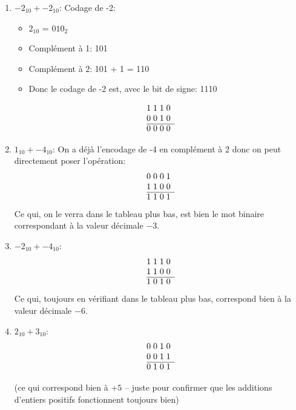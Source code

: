 \documentclass[12pt]{article}
\newenvironment{MaReponse}
		{\begin{greyedtextbox}\itshape} %
		{\end{greyedtextbox}}            %
\newenvironment{alphenum}
{\begin{enumerate}[label=\alph*.]}
	{\end{enumerate}}
\begin{document}
\begin{MaReponse}
\begin{alphenum}
			\item $-2_{10} + -2_{10}$: Codage de -2:
			\begin{itemize}
				\item $2_{10}$ = $010_2$
				\item Complément à 1: 101
				\item Complément à 2: 101 + 1 = 110
				\item Donc le codage de -2 est, avec le bit de signe: 1110
			\end{itemize}
			\[
			\begin{array}{@{}r *{4}{@{\;}c}}
				& 1 & 1 & 1 & 0 \\
				& 0 & 0 & 1 & 0  \\
				\cline{2-5}
				& 0 & 0 & 0 & 0 \\
			\end{array}
			\]
			\item $1_{10} + -4_{10}$: On a déjà l'encodage de -4 en complément à 2 donc on peut directement poser l'opération:
			\[
			\begin{array}{@{}r *{4}{@{\;}c}}
				& 0 & 0 & 0 & 1 \\
				& 1 & 1 & 0 & 0  \\
				\cline{2-5}
				& 1 & 1 & 0 & 1 \\
			\end{array}
			\]
			Ce qui, on le verra dans le tableau plus bas, est bien le mot binaire correspondant à la valeur décimale $-3$.
			\item $-2_{10} + -4_{10}$:
			\[
			\begin{array}{@{}r *{4}{@{\;}c}}
				& 1 & 1 & 1 & 0 \\
				& 1 & 1 & 0 & 0  \\
				\cline{2-5}
				& 1 & 0 & 1 & 0 \\
			\end{array}
			\]
			Ce qui, toujours en vérifiant dans le tableau plus bas, correspond bien à la valeur décimale $-6$.
			\item $2_{10} + 3_{10}$:
			\[
			\begin{array}{@{}r *{4}{@{\;}c}}
				& 0 & 0 & 1 & 0 \\
				& 0 & 0 & 1 & 1  \\
				\cline{2-5}
				& 0 & 1 & 0 & 1 \\
			\end{array}
			\]
			
		(ce qui correspond bien à $+5$ -- juste pour confirmer que les additions d'entiers positifs fonctionnent toujours bien)
		

\end{alphenum}
\end{MaReponse}
\end{document}
